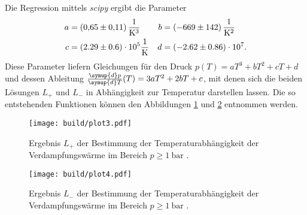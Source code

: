 Die Regression mittels \textit{scipy} \cite{scipy} ergibt die Parameter
\begin{align*}
    a &= \qty{0.65 +- 0.11}{\per\cubic\kelvin} & b &= \qty{-669 +- 142}{\per\kelvin\squared} \\
    c &= (2.29 \pm 0.6) \cdot 10^5 \unit{\per\kelvin}     & d &= (-2.62 \pm 0.86) \cdot 10^7. \\ 
\end{align*}
Diese Parameter liefern Gleichungen für den Druck $p(T) = aT^3 + bT^2 + cT + d$ und dessen Ableitung $\frac{\symup{d}p}{\symup{d}T}(T) = 3aT^2 + 2bT + c$, mit denen 
sich die beiden Lösungen $L_+$ und $L_-$ in Abhängigkeit zur Temperatur darstellen lassen. Die so entstehenden Funktionen können den Abbildungen \ref{fig:plot3} und 
\ref{fig:plot4} entnommen werden.

\begin{figure}
    \centering
    \texttt{[image: build/plot3.pdf]}
    \caption{Ergebnis $L_+$ der Bestimmung der Temperaturabhängigkeit der Verdampfungswärme im Bereich $p \geq \qty{1}{\bar}$ \cite{matplotlib}.}
    \label{fig:plot3}
\end{figure}

\begin{figure}
    \centering
    \texttt{[image: build/plot4.pdf]}
    \caption{Ergebnis $L_-$ der Bestimmung der Temperaturabhängigkeit der Verdampfungswärme im Bereich $p \geq \qty{1}{\bar}$ \cite{matplotlib}.}
    \label{fig:plot4}
\end{figure}
